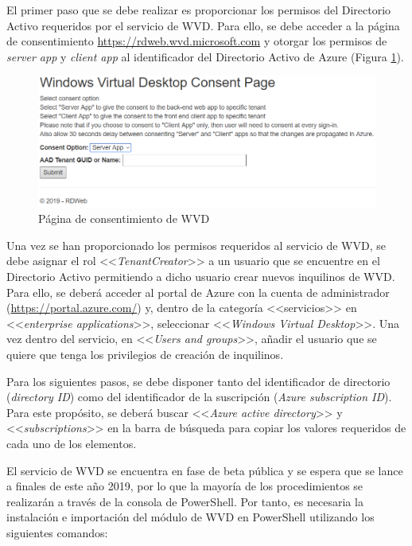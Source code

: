 El primer paso que se debe realizar es proporcionar los permisos del Directorio Activo requeridos por el servicio de \acs{WVD}. Para ello, se debe acceder a la página de consentimiento \url{https://rdweb.wvd.microsoft.com} y otorgar los permisos de \textit{server app} y \textit{client app} al identificador del Directorio Activo de Azure (Figura \ref{fig:consentAAD}).

\begin{figure}[h]
  \centering
  \includegraphics[width=0.8\linewidth]{figures/images/consentAAD.PNG}
  \caption{Página de consentimiento de \acs{WVD}}
  \label{fig:consentAAD}
\end{figure}

\clearpage

Una vez se han proporcionado los permisos requeridos al servicio de \acs{WVD}, se debe asignar el rol <<\textit{TenantCreator}>> a un usuario que se encuentre en el Directorio Activo permitiendo a dicho usuario crear nuevos inquilinos de \acs{WVD}. Para ello, se deberá acceder al portal de Azure con la cuenta de administrador (\url{https://portal.azure.com/}) y, dentro de la categoría <<servicios>> en <<\textit{enterprise applications}>>, seleccionar <<\textit{Windows Virtual Desktop}>>. Una vez dentro del servicio, en <<\textit{Users and groups}>>, añadir el usuario que se quiere que tenga los privilegios de creación de inquilinos.

Para los siguientes pasos, se debe disponer tanto del identificador de directorio (\textit{directory ID}) como del identificador de la suscripción (\textit{Azure subscription ID}). Para este propósito, se deberá buscar <<\textit{Azure active directory}>> y <<\textit{subscriptions}>> en la barra de búsqueda para copiar los valores requeridos de cada uno de los elementos.

El servicio de \acs{WVD} se encuentra en fase de beta pública y se espera que se lance a finales de este año 2019, por lo que la mayoría de los procedimientos se realizarán a través de la consola de PowerShell. Por tanto, es necesaria la instalación e importación del módulo de \acs{WVD} en PowerShell utilizando los siguientes comandos:

